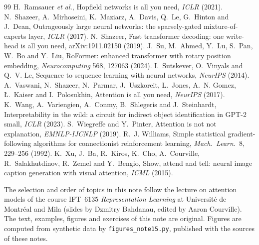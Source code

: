 \documentclass[11pt]{article}
\renewcommand{\SourceNote}{%
  \par\vfill{\footnotesize\color{mute}The selection and order of topics in this note follow the lecture on attention
  models of the course IFT~6135 \emph{Representation Learning} at Université de Montréal and Mila (slides by Dzmitry
  Bahdanau, edited by Aaron Courville). The text, examples, figures and exercises of this note are original. Figures are
  computed from synthetic data by \texttt{figures\_note15.py}, published with the sources of these notes.\par}}
\begin{document}
\begin{thebibliography}{99}
 H.~Ramsauer \emph{et al.}, Hopfield networks is all you need, \emph{ICLR} (2021).
 N.~Shazeer, A.~Mirhoseini, K.~Maziarz, A.~Davis, Q.~Le, G.~Hinton and J.~Dean, Outrageously large neural networks: the sparsely-gated mixture-of-experts layer, \emph{ICLR} (2017).
 N.~Shazeer, Fast transformer decoding: one write-head is all you need, arXiv:1911.02150 (2019).
 J.~Su, M.~Ahmed, Y.~Lu, S.~Pan, W.~Bo and Y.~Liu, RoFormer: enhanced transformer with rotary position embedding, \emph{Neurocomputing} 568, 127063 (2024).
 I.~Sutskever, O.~Vinyals and Q.~V. Le, Sequence to sequence learning with neural networks, \emph{NeurIPS} (2014).
 A.~Vaswani, N.~Shazeer, N.~Parmar, J.~Uszkoreit, L.~Jones, A.~N. Gomez, Ł.~Kaiser and I.~Polosukhin, Attention is all you need, \emph{NeurIPS} (2017).
 K.~Wang, A.~Variengien, A.~Conmy, B.~Shlegeris and J.~Steinhardt, Interpretability in the wild: a circuit for indirect object identification in GPT-2 small, \emph{ICLR} (2023).
 S.~Wiegreffe and Y.~Pinter, Attention is not not explanation, \emph{EMNLP-IJCNLP} (2019).
 R.~J. Williams, Simple statistical gradient-following algorithms for connectionist reinforcement learning, \emph{Mach.\ Learn.}\ 8, 229--256 (1992).
 K.~Xu, J.~Ba, R.~Kiros, K.~Cho, A.~Courville, R.~Salakhutdinov, R.~Zemel and Y.~Bengio, Show, attend and tell: neural image caption generation with visual attention, \emph{ICML} (2015).
\end{thebibliography}

\SourceNote
\end{document}
